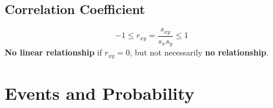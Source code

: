 \documentclass{article}
\begin{document}
\begin{multicols}{3}
    \subsection{Correlation Coefficient}
    \begin{equation*}
        -1 \le r_{xy} = \frac{s_{xy}}{s_x s_y} \le 1
    \end{equation*}
    \textbf{No linear relationship} if \(r_{xy} = 0\), but not necessarily \textbf{no relationship}.
    \section{Events and Probability}

\end{multicols}
\end{document}
